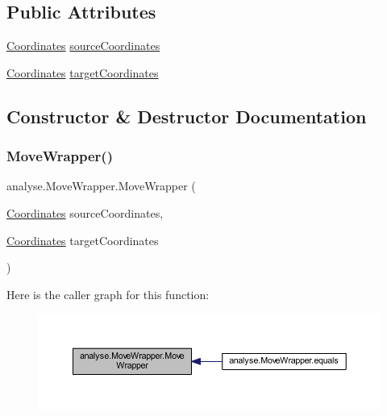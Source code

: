 \subsection*{Public Attributes}
\begin{DoxyCompactItemize}
\item 
\mbox{\hyperlink{classrule_engine_1_1_coordinates}{Coordinates}} \mbox{\hyperlink{classanalyse_1_1_move_wrapper_af196805fcb3f688de2743f24ac1d45d3}{source\+Coordinates}}
\item 
\mbox{\hyperlink{classrule_engine_1_1_coordinates}{Coordinates}} \mbox{\hyperlink{classanalyse_1_1_move_wrapper_a62f9fb14450668e15cc2df3014e8545c}{target\+Coordinates}}
\end{DoxyCompactItemize}


\subsection{Constructor \& Destructor Documentation}
\mbox{\label{classanalyse_1_1_move_wrapper_a61f841f79d6e29cbb55cbe2417e0b07b}} 
\subsubsection{\texorpdfstring{Move\+Wrapper()}{MoveWrapper()}}
{\footnotesize\ttfamily analyse.\+Move\+Wrapper.\+Move\+Wrapper (\begin{DoxyParamCaption}\item[{\mbox{\hyperlink{classrule_engine_1_1_coordinates}{Coordinates}}}]{source\+Coordinates,  }\item[{\mbox{\hyperlink{classrule_engine_1_1_coordinates}{Coordinates}}}]{target\+Coordinates }\end{DoxyParamCaption})\hspace{0.3cm}{\ttfamily [inline]}}

Here is the caller graph for this function\+:
\nopagebreak
\begin{figure}[H]
\begin{center}
\leavevmode
\includegraphics[width=350pt]{classanalyse_1_1_move_wrapper_a61f841f79d6e29cbb55cbe2417e0b07b_icgraph}
\end{center}
\end{figure}


